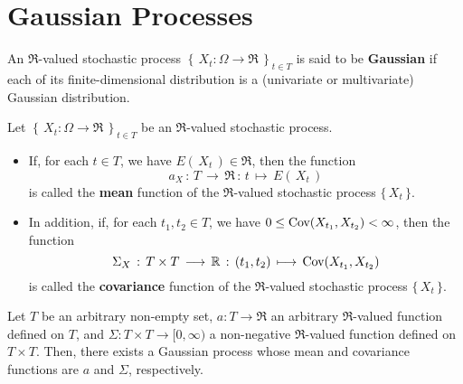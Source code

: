 

\section{Gaussian Processes}
\setcounter{theorem}{0}
\setcounter{equation}{0}

\begin{definition}
\mbox{}\vskip 0cm
\noindent
An $\Re$-valued stochastic process
$\left\{\,X_{t}:\Omega\longrightarrow\Re\,\right\}_{t \in T}$
is said to be \textbf{Gaussian} if each of its finite-dimensional distribution is a
(univariate or multivariate) Gaussian distribution.
\end{definition}

\begin{definition}
\mbox{}\vskip 0.1cm
\noindent
Let $\left\{\,X_{t}:\Omega\longrightarrow\Re\,\right\}_{t \in T}$ be an
$\Re$-valued stochastic process.
\begin{itemize}
\item If, for each $t \in T$, we have $E\!\left(\,X_{t}\,\right) \in \Re$, then the function
\begin{equation*}
a_{X} \,:\, T \, \longrightarrow \, \Re \, : \, t \, \longmapsto \, E\!\left(\,X_{t}\,\right)
\end{equation*}
is called the \textbf{mean} function of the $\Re$-valued stochastic process $\{\,X_{t}\,\}$.
\item In addition, if, for each $t_{1},t_{2} \in T$, we have $0 \leq \textnormal{Cov}\!\left(X_{t_{1}},X_{t_{2}}\right) < \infty$,
then the function
\begin{equation*}
\Sigma_{X} \,:\, T \times T \, \longrightarrow \, \mathbb{R} \, : \, (t_{1},t_{2}) \, \longmapsto \, \textnormal{Cov}\!\left(X_{t_{1}},X_{t_{2}}\right)
\end{equation*}
is called the \textbf{covariance} function of the $\Re$-valued stochastic process $\{\,X_{t}\,\}$.
\end{itemize}
\end{definition}

\begin{theorem}
\mbox{}\vskip 0cm
\noindent
Let $T$ be an arbitrary non-empty set, $a : T \longrightarrow \Re$ an arbitrary $\Re$-valued function
defined on $T$, and $\Sigma : T \times T \longrightarrow [0,\infty)$ a non-negative $\Re$-valued function
defined on $T \times T$. Then, there exists a Gaussian process whose mean and covariance functions
are $a$ and $\Sigma$, respectively. 
\end{theorem}

